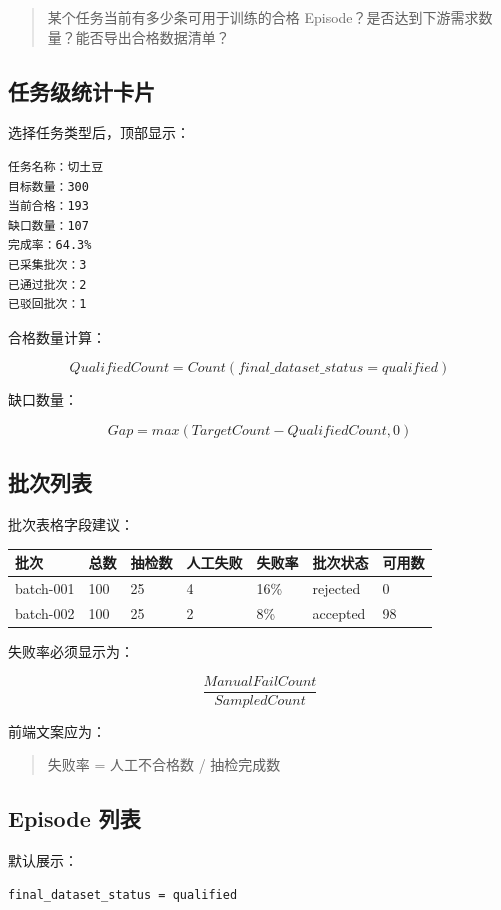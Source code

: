 \documentclass[UTF8,12pt,a4paper]{ctexart}
\begin{document}
\begin{quote}
某个任务当前有多少条可用于训练的合格 Episode？是否达到下游需求数量？能否导出合格数据清单？
\end{quote}

\subsection{任务级统计卡片}

选择任务类型后，顶部显示：

\begin{lstlisting}
任务名称：切土豆
目标数量：300
当前合格：193
缺口数量：107
完成率：64.3%
已采集批次：3
已通过批次：2
已驳回批次：1
\end{lstlisting}

合格数量计算：

\[
QualifiedCount=Count(final\_dataset\_status=qualified)
\]

缺口数量：

\[
Gap=max(TargetCount-QualifiedCount,0)
\]

\subsection{批次列表}

批次表格字段建议：

\begin{longtable}{p{2.5cm}p{2cm}p{2cm}p{2cm}p{2cm}p{2.2cm}p{2cm}}
\toprule
批次 & 总数 & 抽检数 & 人工失败 & 失败率 & 批次状态 & 可用数 \\
\midrule
batch-001 & 100 & 25 & 4 & 16\% & rejected & 0 \\
batch-002 & 100 & 25 & 2 & 8\% & accepted & 98 \\
\bottomrule
\end{longtable}

失败率必须显示为：

\[
\frac{ManualFailCount}{SampledCount}
\]

前端文案应为：

\begin{quote}
失败率 = 人工不合格数 / 抽检完成数
\end{quote}

\subsection{Episode 列表}

默认展示：

\begin{lstlisting}
final_dataset_status = qualified
\end{lstlisting}
\end{document}
